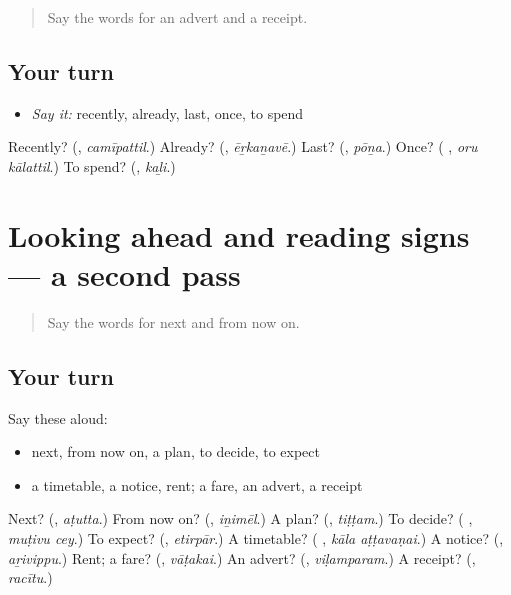 \label{lesson:TA-R160-first-pass-looking-back}



\begin{quote}
Say the words for an advert and a receipt.
\end{quote}

\subsection*{Your turn}
\begin{itemize}
\raggedright
  \item \emph{Say it:} recently, already, last, once, to spend
\end{itemize}

\begin{tcolorbox}[breakable,colback=teal!4,colframe=teal!35!black,title={Before you move on}]
Recently? (\textbf{}, \emph{camīpattil}.) Already? (\textbf{}, \emph{ēṟkaṉavē}.) Last? (\textbf{}, \emph{pōṉa}.) Once? (\textbf{ }, \emph{oru kālattil}.) To spend? (\textbf{}, \emph{kaḻi}.)
\end{tcolorbox}
\section[(dialogue)]{Looking ahead and reading signs — a second pass}

\label{lesson:TA-R160-second-pass-looking-ahead-and-reading-signs}



\begin{quote}
Say the words for next and from now on.
\end{quote}

\subsection*{Your turn}
Say these aloud:

\begin{itemize}
\raggedright
  \item next, from now on, a plan, to decide, to expect
  \item a timetable, a notice, rent; a fare, an advert, a receipt
\end{itemize}

\begin{tcolorbox}[breakable,colback=teal!4,colframe=teal!35!black,title={Before you move on}]
Next? (\textbf{}, \emph{aṭutta}.) From now on? (\textbf{}, \emph{iṉimēl}.) A plan? (\textbf{}, \emph{tiṭṭam}.) To decide? (\textbf{ }, \emph{muṭivu cey}.) To expect? (\textbf{}, \emph{etirpār}.) A timetable? (\textbf{ }, \emph{kāla aṭṭavaṇai}.) A notice? (\textbf{}, \emph{aṟivippu}.) Rent; a fare? (\textbf{}, \emph{vāṭakai}.) An advert? (\textbf{}, \emph{viḷamparam}.) A receipt? (\textbf{}, \emph{racītu}.)
\end{tcolorbox}
